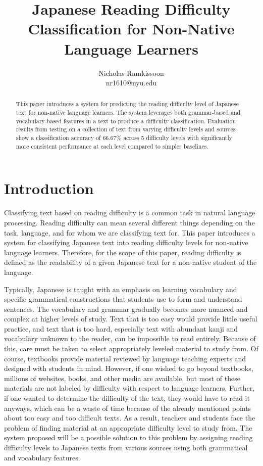 \documentclass[12pt, a4paper]{article}
\title{\textbf{Japanese Reading Difficulty Classification for Non-Native Language Learners}}
\author{Nicholas Ramkissoon \\ nr1610@nyu.edu}
\date{}
\begin{document}
\maketitle

\begin{abstract}
    This paper introduces a system for predicting the reading difficulty level of Japanese
    text for non-native language learners. The system leverages both grammar-based and vocabulary-based
    features in a text to produce a difficulty classification. 
    Evaluation results from testing on a collection of
    text from varying difficulty levels and sources show a classification accuracy of 66.67\% across 5 
    difficulty levels with significantly more
    consistent performance at each level compared to simpler baselines.

\end{abstract}

\section{Introduction}

Classifying text based on reading difficulty is a common task in natural language processing. 
Reading difficulty can mean several different things depending on the task, language, and for whom we are
classifying text for. This paper introduces a system for classifying Japanese text into reading difficulty levels
for non-native language learners. Therefore, for the scope of this paper, reading difficulty is defined as the readability of a given Japanese text for
a non-native student of the language. 
\par
Typically, Japanese is taught with an emphasis on learning vocabulary and specific 
grammatical constructions that students use to form and understand sentences. 
The vocabulary and grammar gradually becomes more nuanced and complex at higher levels of study. 
Text that is too easy would provide little
useful practice, and text that is too hard, especially text with abundant kanji and vocabulary unknown to
the reader, can be impossible to read entirely. Because of this, care must be taken to select appropriately leveled 
material to study from. Of course, textbooks provide material reviewed by language teaching experts and designed with students in mind. However, 
if one wished to go beyond textbooks, millions of websites, books, and other media are available, but most of these materials are not 
labeled by difficulty with respect to language learners. Further, if one wanted to determine the difficulty of the text,
they would have to read it anyways, which can be a waste of time because of the already mentioned points about too easy and too difficult texts. 
As a result, teachers and students face the problem of finding material
at an appropriate difficulty level to study from. The system proposed will be a possible solution to this problem by
assigning reading difficulty levels to Japanese texts from various sources using both grammatical and vocabulary features.
\end{document}
